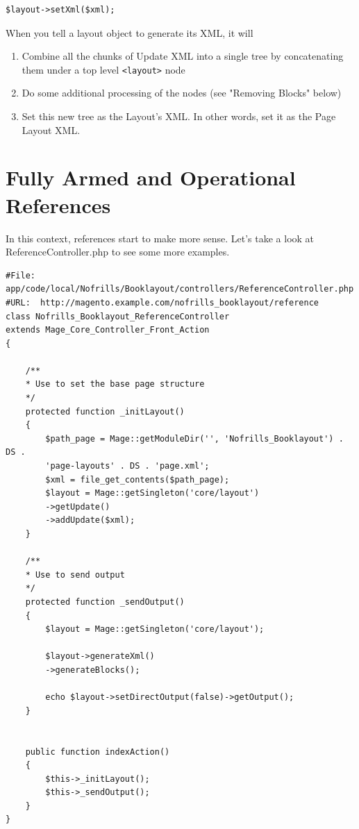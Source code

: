 \documentclass[oneside]{book}
\begin{document}
\begin{lstlisting}
$layout->setXml($xml);

\end{lstlisting}


When you tell a layout object to generate its XML, it will

\begin{enumerate}
\item Combine all the chunks of Update XML into a single tree by concatenating them under a top level \footnotesize\texttt{\textless layout\textgreater } \normalsize  node
\item Do some additional processing of the nodes (see "Removing Blocks" below)
\item Set this new tree as the Layout's XML.  In other words, set it as the Page Layout XML.
\end{enumerate}


\section{Fully Armed and Operational References}

In this context, references start to make more sense.  Let's take a look at ReferenceController.php to see some more examples.

\begin{lstlisting}
#File: app/code/local/Nofrills/Booklayout/controllers/ReferenceController.php
#URL:  http://magento.example.com/nofrills_booklayout/reference
class Nofrills_Booklayout_ReferenceController
extends Mage_Core_Controller_Front_Action
{

    /**
    * Use to set the base page structure
    */
    protected function _initLayout()
    {
        $path_page = Mage::getModuleDir('', 'Nofrills_Booklayout') . DS .
        'page-layouts' . DS . 'page.xml';
        $xml = file_get_contents($path_page);
        $layout = Mage::getSingleton('core/layout')
        ->getUpdate()
        ->addUpdate($xml);
    }

    /**
    * Use to send output
    */
    protected function _sendOutput()
    {
        $layout = Mage::getSingleton('core/layout');

        $layout->generateXml()
        ->generateBlocks();

        echo $layout->setDirectOutput(false)->getOutput();
    }


    public function indexAction()
    {
        $this->_initLayout();
        $this->_sendOutput();
    }
}

\end{lstlisting}
\end{document}
